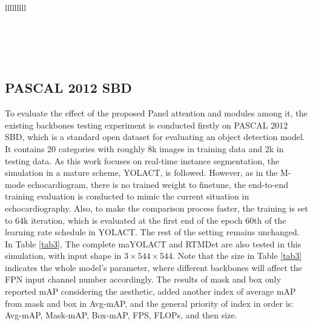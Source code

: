 \documentclass{article}
\begin{document}
\begin{table*}[!t]
{\begin{tabular}{lllllllll}
\\
\\
\\
\\
\\
\end{tabular}}
\end{table*}

\subsection{PASCAL 2012 SBD}
To evaluate the effect of the proposed Panel attention and modules among it, the existing backbones testing experiment is conducted firstly on PASCAL 2012 SBD, which is a standard open dataset for evaluating an object detection model. It contains 20 categories with roughly 8k images in training data and 2k in testing data. As this work focuses on real-time instance segmentation, the simulation in a mature scheme, YOLACT, is followed. However, as in the M-mode echocardiogram, there is no trained weight to finetune, the end-to-end training evaluation is conducted to mimic the current situation in echocardiography. Also, to make the comparison process faster, the training is set to 64k iteration, which is evaluated at the first end of the epoch 60th of the learning rate schedule in YOLACT. The rest of the setting remains unchanged. In Table \ref{tab3}, The complete maYOLACT and RTMDet are also tested in this simulation, with input shape in $3\times544\times544$. Note that the size in Table \ref{tab3} indicates the whole model’s parameter, where different backbones will affect the FPN input channel number accordingly. The results of mask and box only reported mAP considering the aesthetic, added another index of average mAP from mask and box in Avg-mAP, and the general priority of index in order is: Avg-mAP, Mask-mAP, Box-mAP, FPS, FLOPs, and then size. 
\end{document}
